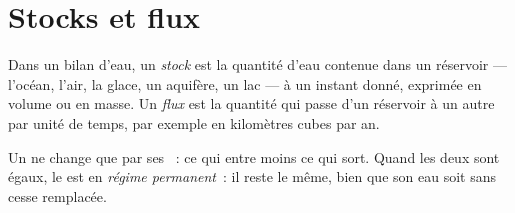 \section{Stocks et flux}

\begin{definition}\label{def:g10:freshwater-resources:stock}
Dans un bilan d'eau, un \emph{stock} est la quantité
d'eau contenue dans un réservoir --- l'océan, l'air, la glace, un aquifère,
un lac --- à un instant donné, exprimée en volume ou en masse. Un
\emph{flux} est la quantité qui passe d'un réservoir à un autre par unité
de temps, par exemple en kilomètres cubes par an.
\end{definition}

Un  ne change que par ses ~: ce qui entre moins ce qui sort. Quand
les deux sont égaux, le  est en \emph{régime permanent}~: il reste le
même, bien que son eau soit sans cesse remplacée.

